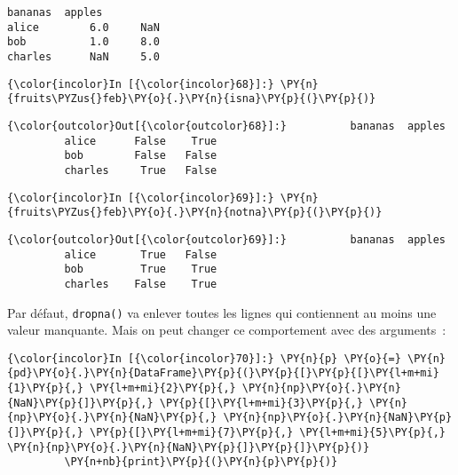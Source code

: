     \begin{Verbatim}[commandchars=\\\{\}]
         bananas  apples
alice        6.0     NaN
bob          1.0     8.0
charles      NaN     5.0

    \end{Verbatim}

    \begin{Verbatim}[commandchars=\\\{\}]
{\color{incolor}In [{\color{incolor}68}]:} \PY{n}{fruits\PYZus{}feb}\PY{o}{.}\PY{n}{isna}\PY{p}{(}\PY{p}{)}
\end{Verbatim}


\begin{Verbatim}[commandchars=\\\{\}]
{\color{outcolor}Out[{\color{outcolor}68}]:}          bananas  apples
         alice      False    True
         bob        False   False
         charles     True   False
\end{Verbatim}
            
    \begin{Verbatim}[commandchars=\\\{\}]
{\color{incolor}In [{\color{incolor}69}]:} \PY{n}{fruits\PYZus{}feb}\PY{o}{.}\PY{n}{notna}\PY{p}{(}\PY{p}{)}
\end{Verbatim}


\begin{Verbatim}[commandchars=\\\{\}]
{\color{outcolor}Out[{\color{outcolor}69}]:}          bananas  apples
         alice       True   False
         bob         True    True
         charles    False    True
\end{Verbatim}
            
    Par défaut, \texttt{dropna()} va enlever toutes les lignes qui
contiennent au moins une valeur manquante. Mais on peut changer ce
comportement avec des arguments~:

    \begin{Verbatim}[commandchars=\\\{\}]
{\color{incolor}In [{\color{incolor}70}]:} \PY{n}{p} \PY{o}{=} \PY{n}{pd}\PY{o}{.}\PY{n}{DataFrame}\PY{p}{(}\PY{p}{[}\PY{p}{[}\PY{l+m+mi}{1}\PY{p}{,} \PY{l+m+mi}{2}\PY{p}{,} \PY{n}{np}\PY{o}{.}\PY{n}{NaN}\PY{p}{]}\PY{p}{,} \PY{p}{[}\PY{l+m+mi}{3}\PY{p}{,} \PY{n}{np}\PY{o}{.}\PY{n}{NaN}\PY{p}{,} \PY{n}{np}\PY{o}{.}\PY{n}{NaN}\PY{p}{]}\PY{p}{,} \PY{p}{[}\PY{l+m+mi}{7}\PY{p}{,} \PY{l+m+mi}{5}\PY{p}{,} \PY{n}{np}\PY{o}{.}\PY{n}{NaN}\PY{p}{]}\PY{p}{]}\PY{p}{)}
         \PY{n+nb}{print}\PY{p}{(}\PY{n}{p}\PY{p}{)}
\end{Verbatim}


